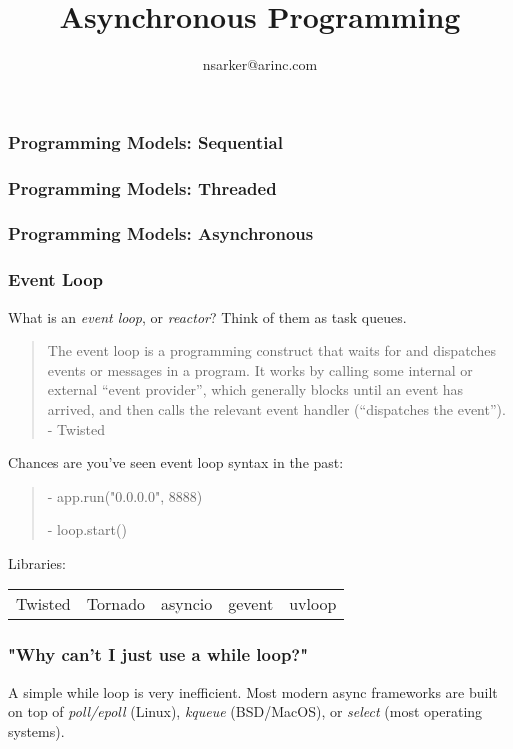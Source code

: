 \documentclass{beamer}
\author{nsarker@arinc.com}
\title{Asynchronous Programming}
\date{}
\begin{document}
\small

\begin{frame}
    \titlepage
\end{frame}


\begin{frame}
\frametitle{Programming Models: Sequential}
\end{frame}


\begin{frame}
\frametitle{Programming Models: Threaded}
\end{frame}


\begin{frame}
\frametitle{Programming Models: Asynchronous}
\end{frame}


\begin{frame}
\frametitle{Event Loop}
What is an \textit{event loop}, or \textit{reactor}? Think of them as task queues.

\begin{quote}
    The event loop is a programming construct that waits for and dispatches events or messages in a program. It works by calling some internal or external “event provider”, which generally blocks until an event has arrived, and then calls the relevant event handler (“dispatches the event”). - Twisted
\end{quote}

Chances are you've seen event loop syntax in the past:
\begin{quote}
    \begin{semiverbatim}
    - app.run("0.0.0.0", 8888)

    - loop.start()
    \end{semiverbatim}
\end{quote}

Libraries:

\begin{tabular}{l l l l l}
    Twisted & Tornado & asyncio & gevent & uvloop
\end{tabular}

\end{frame}


\begin{frame}
\frametitle{"Why can't I just use a while loop?"}
A simple while loop is very inefficient. Most modern async frameworks are built on top of \textit{poll/epoll} (Linux), \textit{kqueue} (BSD/MacOS), or \textit{select} (most operating systems).
\end{frame}
\end{document}
